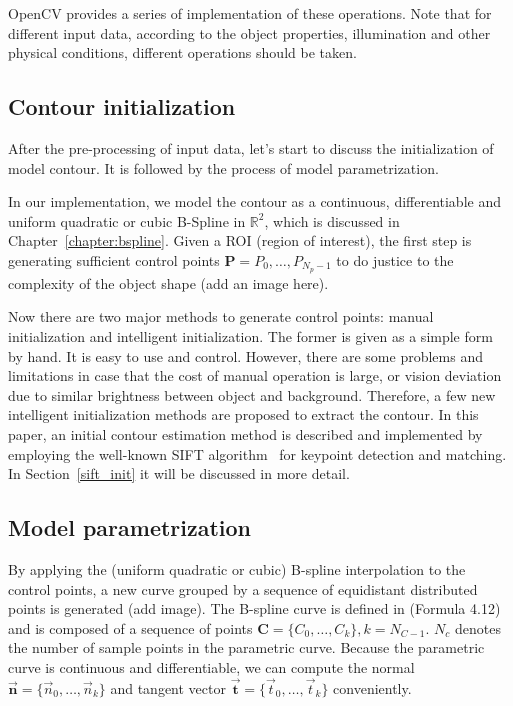 OpenCV provides a series of implementation of these operations. Note
that for different input data, according to the object properties,
illumination and other physical conditions, different operations
should be taken. 

\subsection{Contour initialization}
\label{sec:mp}

After the pre-processing of input data, let's start to discuss the
initialization of model contour. It is followed by the process of
model parametrization.

In our implementation, we model the
contour as a continuous, differentiable and uniform quadratic or cubic
B-Spline in $\mathbb{R}^2$, which is discussed in Chapter~\ref{chapter:bspline}. 
Given a ROI (region of interest), the first step is generating
sufficient control points $\mathbf{P} = {P_0, \ldots, P_{N_p-1}}$ to
do justice to the complexity of the object shape (add an image here).

Now there are two major methods to generate control points:
manual initialization and intelligent initialization. The former is
given as a simple form by hand. It is easy to use and
control. However, there are some problems and limitations in case that
the cost of manual operation is large, or vision deviation due to
similar brightness between object and background. Therefore, a few new
intelligent initialization methods are proposed to extract the
contour.
In this paper, an initial contour estimation method is described and
implemented by employing the well-known SIFT algorithm~\cite{lowe2004distinctive} for
keypoint detection and matching. In Section~\ref{sift_init} it will be discussed in
more detail.

\subsection{Model parametrization}
\label{sec:mp}

By applying the (uniform quadratic or cubic) B-spline interpolation to the control points, a new curve
grouped by a sequence of equidistant distributed points is generated
(add image). The B-spline curve is defined in (Formula 4.12) and is
composed of a sequence of points $\mathbf{C} = \{C_0, \ldots,
C_{k}\}, k = N_{C-1}$. $N_c$ denotes the number of sample points in the
parametric curve. Because the parametric curve is continuous and
differentiable, we can compute the normal $\vec{\mathbf{n}} = \{\vec{n}_0, \ldots,
\vec{n}_{k}\}$ and tangent vector $\vec{\mathbf{t}} = \{\vec{t}_0, \ldots, \vec{t}_{k}\}$
conveniently. 


